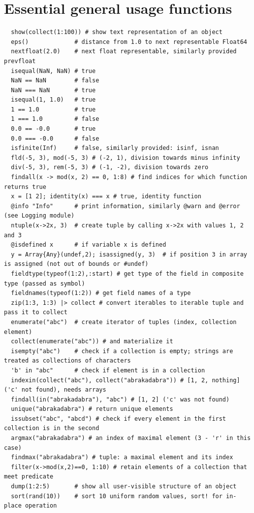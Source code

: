 \documentclass[10pt,a4paper]{article}
\begin{document}
\section{Essential general usage functions}
\begin{lstlisting}
  show(collect(1:100)) # show text representation of an object
  eps()             # distance from 1.0 to next representable Float64
  nextfloat(2.0)    # next float representable, similarly provided prevfloat
  isequal(NaN, NaN) # true
  NaN == NaN        # false
  NaN === NaN       # true
  isequal(1, 1.0)   # true
  1 == 1.0          # true
  1 === 1.0         # false
  0.0 == -0.0       # true
  0.0 === -0.0      # false
  isfinite(Inf)     # false, similarly provided: isinf, isnan
  fld(-5, 3), mod(-5, 3) # (-2, 1), division towards minus infinity
  div(-5, 3), rem(-5, 3) # (-1, -2), division towards zero
  findall(x -> mod(x, 2) == 0, 1:8) # find indices for which function returns true
  x = [1 2]; identity(x) === x # true, identity function
  @info "Info"      # print information, similarly @warn and @error (see Logging module)
  ntuple(x->2x, 3)  # create tuple by calling x->2x with values 1, 2 and 3
  @isdefined x      # if variable x is defined
  y = Array{Any}(undef,2); isassigned(y, 3)  # if position 3 in array is assigned (not out of bounds or #undef)
  fieldtype(typeof(1:2),:start) # get type of the field in composite type (passed as symbol)
  fieldnames(typeof(1:2)) # get field names of a type
  zip(1:3, 1:3) |> collect # convert iterables to iterable tuple and pass it to collect
  enumerate("abc")  # create iterator of tuples (index, collection element)
  collect(enumerate("abc")) # and materialize it
  isempty("abc")    # check if a collection is empty; strings are treated as collections of characters
  'b' in "abc"      # check if element is in a collection
  indexin(collect("abc"), collect("abrakadabra")) # [1, 2, nothing] ('c' not found), needs arrays
  findall(in("abrakadabra"), "abc") # [1, 2] ('c' was not found)
  unique("abrakadabra") # return unique elements
  issubset("abc", "abcd") # check if every element in the first collection is in the second
  argmax("abrakadabra") # an index of maximal element (3 - 'r' in this case)
  findmax("abrakadabra") # tuple: a maximal element and its index
  filter(x->mod(x,2)==0, 1:10) # retain elements of a collection that meet predicate
  dump(1:2:5)       # show all user-visible structure of an object
  sort(rand(10))    # sort 10 uniform random values, sort! for in-place operation
\end{lstlisting}
\end{document}
